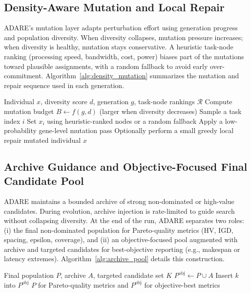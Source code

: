 \documentclass[runningheads]{llncs}
\begin{document}
\subsection{Density-Aware Mutation and Local Repair}
ADARE's mutation layer adapts perturbation effort using generation progress and population diversity. When diversity collapses, mutation pressure increases; when diversity is healthy, mutation stays conservative. A heuristic task-node ranking (processing speed, bandwidth, cost, power) biases part of the mutations toward plausible assignments, with a random fallback to avoid early over-commitment. Algorithm~\ref{alg:density_mutation} summarizes the mutation and repair sequence used in each generation.

\begin{algorithm}[H]
\caption{Density-Aware Mutation with Heuristic Guidance}
\label{alg:density_mutation}
\small
\begin{algorithmic}[1]
\Require Individual $x$, diversity score $d$, generation $g$, task-node rankings $\mathcal{R}$
\State Compute mutation budget $B \gets f(g,d)$ (larger when diversity decreases)
    \State Sample a task index $i$
    \State Set $x_i$ using heuristic-ranked nodes or a random fallback
\EndFor
\State Apply a low-probability gene-level mutation pass
\State Optionally perform a small greedy local repair
\State \Return mutated individual $x$
\end{algorithmic}
\end{algorithm}

\subsection{Archive Guidance and Objective-Focused Final Candidate Pool}
ADARE maintains a bounded archive of strong non-dominated or high-value candidates. During evolution, archive injection is rate-limited to guide search without collapsing diversity. At the end of the run, ADARE separates two roles: (i) the final non-dominated population for Pareto-quality metrics (HV, IGD, spacing, epsilon, coverage), and (ii) an objective-focused pool augmented with archive and targeted candidates for best-objective reporting (e.g., makespan or latency extremes). Algorithm~\ref{alg:archive_pool} details this construction.

\begin{algorithm}[H]
\caption{Archive-Guided Final Objective Pool Construction}
\label{alg:archive_pool}
\small
\begin{algorithmic}[1]
\Require Final population $P$, archive $A$, targeted candidate set $K$
\State $P^{\mathrm{obj}} \gets P \cup A$
        \State Insert $k$ into $P^{\mathrm{obj}}$
    \EndIf
\EndFor
\State \Return $P$ for Pareto-quality metrics and $P^{\mathrm{obj}}$ for objective-best metrics
\end{algorithmic}
\end{algorithm}
\end{document}

